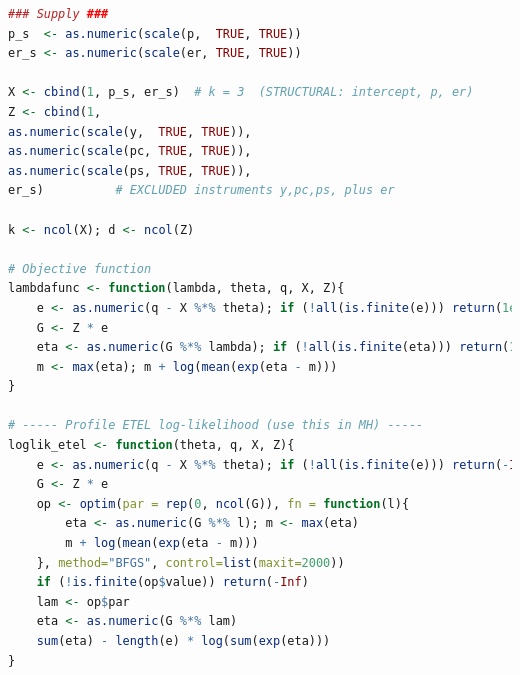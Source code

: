 \begin{enumerate}[leftmargin=*]
\begin{tcolorbox}[enhanced,width=4.67in,center upper,
	fontupper=\large\bfseries,drop shadow southwest,sharp corners]
\begin{VF}
\begin{lstlisting}[language=R]
### Supply ###
p_s  <- as.numeric(scale(p,  TRUE, TRUE))
er_s <- as.numeric(scale(er, TRUE, TRUE))

X <- cbind(1, p_s, er_s)  # k = 3  (STRUCTURAL: intercept, p, er)
Z <- cbind(1,
as.numeric(scale(y,  TRUE, TRUE)),
as.numeric(scale(pc, TRUE, TRUE)),
as.numeric(scale(ps, TRUE, TRUE)),
er_s)          # EXCLUDED instruments y,pc,ps, plus er

k <- ncol(X); d <- ncol(Z)

# Objective function
lambdafunc <- function(lambda, theta, q, X, Z){
	e <- as.numeric(q - X %*% theta); if (!all(is.finite(e))) return(1e300)
	G <- Z * e
	eta <- as.numeric(G %*% lambda); if (!all(is.finite(eta))) return(1e300)
	m <- max(eta); m + log(mean(exp(eta - m)))
}

# ----- Profile ETEL log-likelihood (use this in MH) -----
loglik_etel <- function(theta, q, X, Z){
	e <- as.numeric(q - X %*% theta); if (!all(is.finite(e))) return(-Inf)
	G <- Z * e
	op <- optim(par = rep(0, ncol(G)), fn = function(l){
		eta <- as.numeric(G %*% l); m <- max(eta)
		m + log(mean(exp(eta - m)))
	}, method="BFGS", control=list(maxit=2000))
	if (!is.finite(op$value)) return(-Inf)
	lam <- op$par
	eta <- as.numeric(G %*% lam)
	sum(eta) - length(e) * log(sum(exp(eta))) 
}
\end{lstlisting}
	\end{VF}
\end{tcolorbox} 


\end{enumerate}
